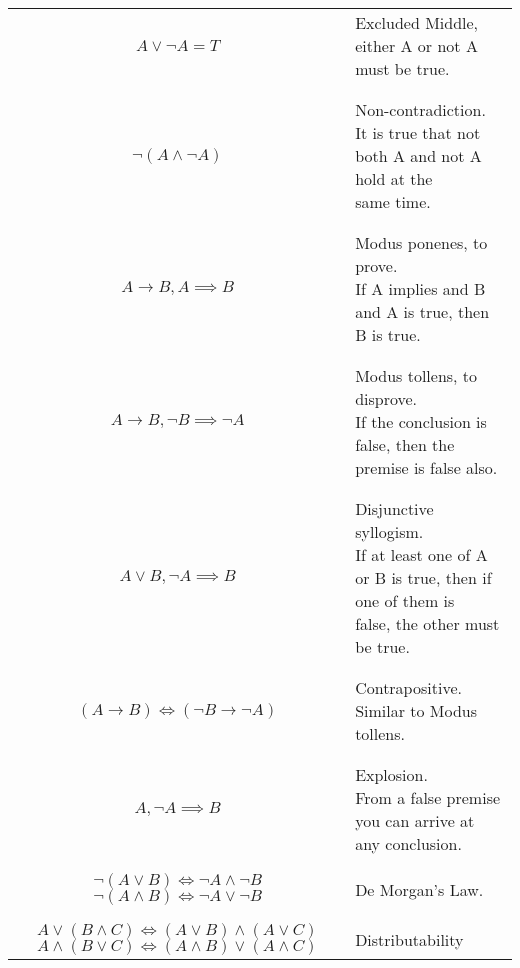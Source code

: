 \documentclass{article}
\newcommand{\false}{{\mathfrak{f}}}
\begin{document}
\begin{table}[H]
    \centering
    \large
    \begin{tabular}{c l}
        $A \vee \lnot A = T$ & Excluded Middle, either A or not A must be true.\\
        &\\
        \hline
        &\\
        $\lnot (A \wedge \lnot A)$ & \makecell[l]{
            Non-contradiction.\\ It is true that not both A and not A hold at the \\same time. 
        }\\
        &\\
        \hline
        &\\
        $A \rightarrow B, A \implies B$ & \makecell[l]{Modus ponenes, to prove. \\
        If A implies and B and A is true, then B is true.}\\
        &\\
        \hline
        &\\
        $A \rightarrow B, \lnot B \implies \lnot A$ & \makecell[l]{Modus tollens, to disprove. \\
        If the conclusion is false, then the premise is false also.}\\
        &\\
        \hline
        &\\
        $A \vee B, \lnot A \implies B$ & \makecell[l]{
            Disjunctive syllogism.\\
            If at least one of A or B is true, then if one of them is \\false, the other must be true.
        }\\
        &\\
        \hline
        &\\
        $(A \rightarrow B) \iff (\lnot B \rightarrow \lnot A)$ & Contrapositive. Similar to Modus tollens.\\
        &\\
        \hline
        &\\
        $A, \lnot A \implies B$ & \makecell[l]{
            Explosion. \\
            From a false premise you can arrive at any conclusion.
        }\\
        &\\
        \hline
        &\\
        \makecell{
            $\lnot (A \vee B) \iff \lnot A \wedge \lnot B$\\
            $\lnot (A \wedge B) \iff \lnot A \vee \lnot B$
        } & De Morgan's Law.\\
        &\\
        \hline
        &\\
        \makecell{
            $A \vee (B \wedge C) \iff (A\vee B) \wedge (A \vee C)$\\
            $A \wedge (B \vee C) \iff (A \wedge B)\vee (A \wedge C)$
        } & Distributability

    \end{tabular}
\end{table} 
\end{document}
